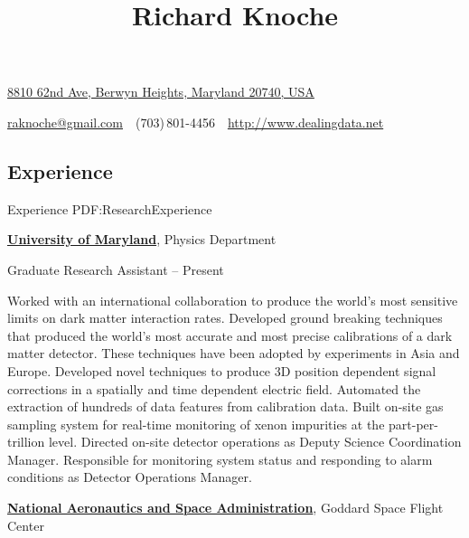 \documentclass[letterpaper,MMMyyyy,nonstop]{simpleresumecv}
\newcommand{\CVAuthor}{Richard Knoche}
\newcommand{\CVWebpage}{http://www.dealingdata.net}
\begin{document}

\title{\CVAuthor}

\begin{subtitle}
\href{https://www.google.com/maps/place/8810+62nd+Ave,+Berwyn+Heights,+MD+20740/@38.995313,-76.908195,17z/data=!3m1!4b1!4m5!3m4!1s0x89b7c3fd69c6911b:0xa23453a69afa6fc8!8m2!3d38.995313!4d-76.908195}
{8810 62nd Ave, Berwyn Heights, Maryland 20740, USA}
\par
\href{mailto:raknoche@gmail.com}
{raknoche@gmail.com}
\,\SubBulletSymbol\,
(703)\,801-4456
\,\SubBulletSymbol\,
\href{\CVWebpage}
{\CVWebpage}
\end{subtitle}

\begin{body}


\section
{Experience}
{Experience}
{PDF:ResearchExperience}

\href{http://umdphysics.umd.edu/}
{\textbf{University of Maryland}},
Physics Department

\GapNoBreak
\BulletItem
Graduate Research Assistant
\hfill
{} -- Present

\begin{detail}
\SubBulletItem
Worked with an international collaboration to produce the world's most sensitive limits on dark matter interaction rates.
\SubBulletItem
Developed ground breaking techniques that produced the world's most accurate and most precise calibrations of a dark matter detector.  These techniques have been adopted by experiments in Asia and Europe.
\SubBulletItem
Developed novel techniques to produce 3D position dependent signal corrections in a spatially and time dependent electric field.
\SubBulletItem
Automated the extraction of hundreds of data features from calibration data.
\SubBulletItem
Built on-site gas sampling system for real-time monitoring of xenon impurities at the part-per-trillion level.
\SubBulletItem
Directed on-site detector operations as Deputy Science Coordination Manager.
\SubBulletItem
Responsible for monitoring system status and responding to alarm conditions as Detector Operations Manager.
\end{detail}

\BigGap
\href{http://csma31.csm.jmu.edu/physics/}
{\textbf{National Aeronautics and Space Administration}},
Goddard Space Flight Center


\end{body}
\end{document}
